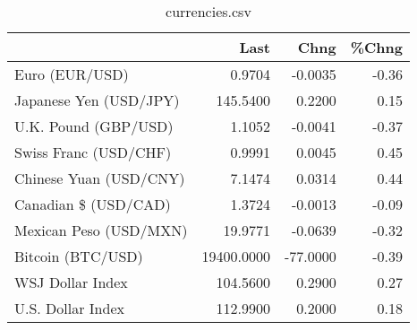 \documentclass{article}%
\begin{document}
%


\begin{table}[htbp]%
\caption{currencies.csv}%
\centering%
\begin{adjustbox}{width=1\textwidth}%
\begin{tabular}{lrrr}
\toprule
                       &       Last &     Chng &  \%Chng \\
\midrule
        Euro (EUR/USD) &     0.9704 &  -0.0035 &  -0.36 \\
Japanese Yen (USD/JPY) &   145.5400 &   0.2200 &   0.15 \\
  U.K. Pound (GBP/USD) &     1.1052 &  -0.0041 &  -0.37 \\
 Swiss Franc (USD/CHF) &     0.9991 &   0.0045 &   0.45 \\
Chinese Yuan (USD/CNY) &     7.1474 &   0.0314 &   0.44 \\
  Canadian \$ (USD/CAD) &     1.3724 &  -0.0013 &  -0.09 \\
Mexican Peso (USD/MXN) &    19.9771 &  -0.0639 &  -0.32 \\
     Bitcoin (BTC/USD) & 19400.0000 & -77.0000 &  -0.39 \\
      WSJ Dollar Index &   104.5600 &   0.2900 &   0.27 \\
     U.S. Dollar Index &   112.9900 &   0.2000 &   0.18 \\
\bottomrule
\end{tabular}
%
\end{adjustbox}%
\end{table}

%
\end{document}
